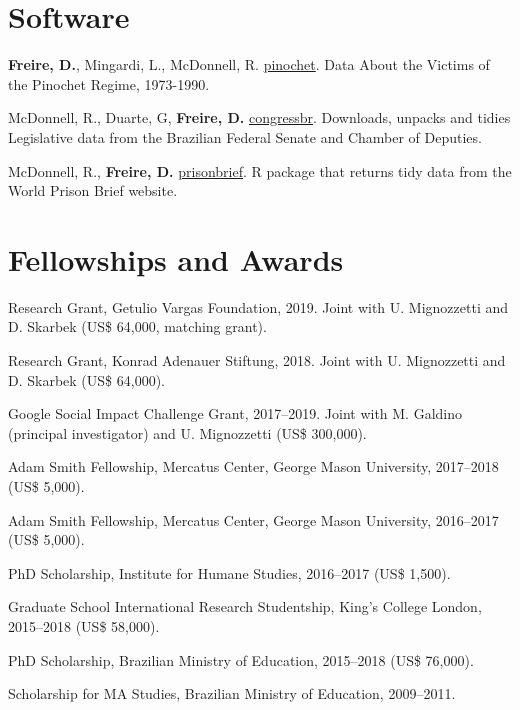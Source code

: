 \documentclass[a4paper]{article}
\renewenvironment{itemize}{
	\begin{list}{}{
			\setlength{\leftmargin}{1.5em}
		}
		}{
	\end{list}
}
\begin{document}
	\section*{Software}

	\begin{itemize}
		\item \textbf{Freire, D.}, Mingardi, L., McDonnell, R. \href{http://danilofreire.github.io/pinochet}{pinochet}. Data About the Victims of the Pinochet Regime, 1973-1990.
		\item McDonnell, R., Duarte, G, \textbf{Freire, D.} \href{https://github.com/RobertMyles/congressbr}{congressbr}. Downloads, unpacks and tidies Legislative data from the Brazilian Federal Senate and Chamber of Deputies.
		\item McDonnell, R., \textbf{Freire, D.} \href{http://danilofreire.github.io/prisonbrief}{prisonbrief}. R package that returns tidy data from the World Prison Brief website. 
	\end{itemize}

	\section*{Fellowships and Awards}

  \begin{itemize}
		\item Research Grant, Getulio Vargas Foundation, 2019. Joint with U. Mignozzetti and D. Skarbek (US\$ 64,000, matching grant).
		\item Research Grant, Konrad Adenauer Stiftung, 2018. Joint with U. Mignozzetti and D. Skarbek (US\$ 64,000).
		\item Google Social Impact Challenge Grant, 2017--2019. Joint with M. Galdino (principal investigator) and U. Mignozzetti (US\$ 300,000).
  	\item Adam Smith Fellowship, Mercatus Center, George Mason University, 2017--2018 (US\$ 5,000).
		\item Adam Smith Fellowship, Mercatus Center, George Mason University, 2016--2017 (US\$ 5,000).
		\item PhD Scholarship, Institute for Humane Studies, 2016--2017 (US\$ 1,500).
		\item Graduate School International Research Studentship, King's College London, 2015--2018 (US\$ 58,000).
		\item PhD Scholarship, Brazilian Ministry of Education, 2015--2018 (US\$ 76,000).
		\item Scholarship for MA Studies, Brazilian Ministry of Education, 2009--2011.
	\end{itemize}
\end{document}
